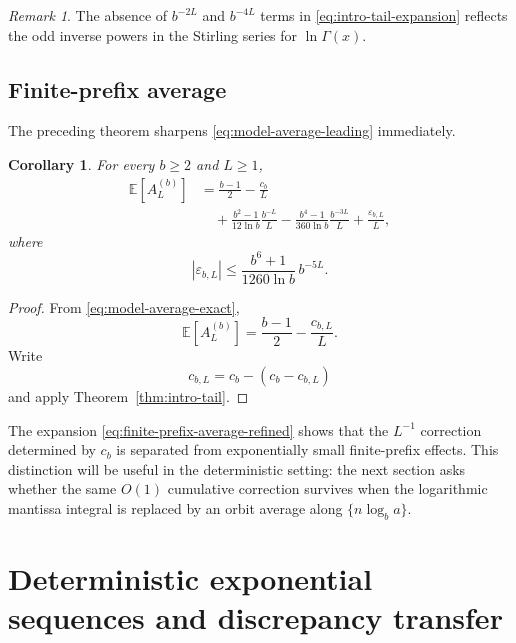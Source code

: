 \documentclass[11pt]{article}
\newtheorem{corollary}[theorem]{Corollary}
\theoremstyle{definition}
\theoremstyle{remark}
\newtheorem*{remark}{Remark}
\begin{document}
\begin{remark}
The absence of \(b^{-2L}\) and \(b^{-4L}\) terms in
\eqref{eq:intro-tail-expansion} reflects the odd inverse powers
in the Stirling series for \(\ln\Gamma(x)\).
\end{remark}


\subsection{Finite-prefix average}
\label{subsec:finite-prefix-average-refined}

The preceding theorem sharpens
\eqref{eq:model-average-leading} immediately.

\begin{corollary}
\label{cor:finite-prefix-average-refined}
For every \(b\ge2\) and \(L\ge1\),
\begin{equation}
\boxed{
\begin{aligned}
    \mathbb E[A_L^{(b)}]
    &=
    \frac{b-1}{2}
    -
    \frac{c_b}{L}
    \\
    &\quad+
    \frac{b^2-1}{12\ln b}
    \frac{b^{-L}}{L}
    -
    \frac{b^4-1}{360\ln b}
    \frac{b^{-3L}}{L}
    +
    \frac{\varepsilon_{b,L}}{L},
\end{aligned}
}
\label{eq:finite-prefix-average-refined}
\end{equation}
where
\[
    |\varepsilon_{b,L}|
    \le
    \frac{b^6+1}{1260\ln b}\,b^{-5L}.
\]
\end{corollary}

\begin{proof}
From
\eqref{eq:model-average-exact},
\[
    \mathbb E[A_L^{(b)}]
    =
    \frac{b-1}{2}
    -
    \frac{c_{b,L}}{L}.
\]
Write
\[
    c_{b,L}
    =
    c_b-(c_b-c_{b,L})
\]
and apply
Theorem~\ref{thm:intro-tail}.
\end{proof}

The expansion
\eqref{eq:finite-prefix-average-refined}
shows that the \(L^{-1}\) correction determined by \(c_b\) is separated
from exponentially small finite-prefix effects.  This distinction will
be useful in the deterministic setting: the next section asks whether
the same \(O(1)\) cumulative correction survives when the logarithmic
mantissa integral is replaced by an orbit average along
\(\{n\log_b a\}\).


\section{Deterministic exponential sequences and discrepancy transfer}
\label{sec:deterministic-transfer}
\end{document}
